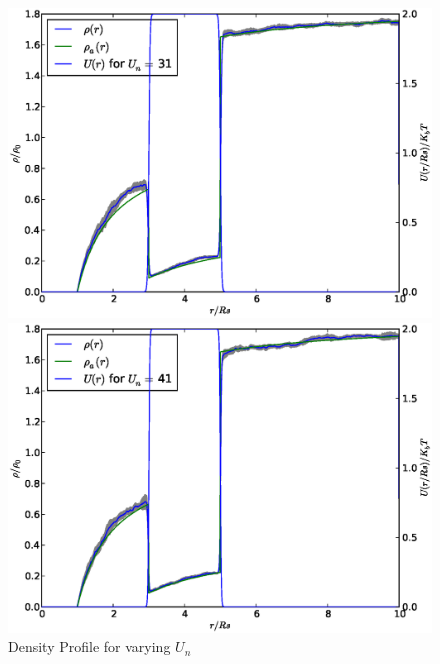 \begin{figure}[H]
\begin{minipage}{.5 \textwidth}
    \includegraphics[width=.95 \textwidth, keepaspectratio]{plots/cp/un/Un31.eps}
\end{minipage}\begin{minipage}{.5 \textwidth}
    \includegraphics[width=.95 \textwidth, keepaspectratio]{plots/cp/un/Un41.eps}
\end{minipage}
 
    \caption{Density Profile for varying $U_n$}
    \label{fig:RhoUnCp}
\end{figure}

